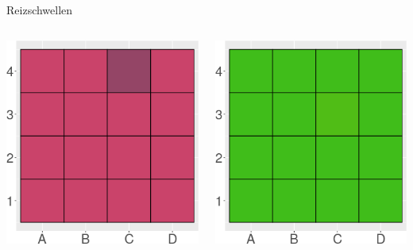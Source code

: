 \documentclass{beamer}
\begin{document}
\begin{frame}{Reizschwellen}
\begin{itemize}
\begin{columns}[c]
    
    \begin{column}{3cm}
    \includegraphics[width=\textwidth]{color_test_screenshot.png}
    
    \end{column}
    
    
    \begin{column}{3cm}
    \includegraphics[width=\textwidth]{color_test_screenshot_2.png}
    

\end{column}
\end{columns}
\end{itemize}
\end{frame}
\end{document}
